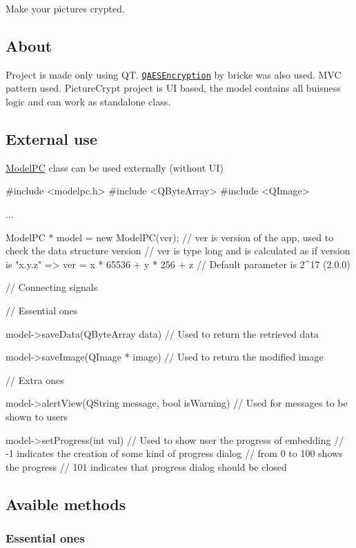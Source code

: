 Make your pictures crypted.

\subsection*{About}

Project is made only using QT. \href{http://github.com/bricke/Qt-AES}{\tt Q\+A\+E\+S\+Encryption} by bricke was also used. M\+VC pattern used. Picture\+Crypt project is UI based, the model contains all buisness logic and can work as standalone class.

\subsection*{External use}

\mbox{\hyperlink{class_model_p_c}{Model\+PC}} class can be used externally (without UI) 
\begin{DoxyCode}
#include <modelpc.h>
#include <QByteArray>
#include <QImage>

...

ModelPC * model = new ModelPC(ver);
// ver is version of the app, used to check the data structure version
// ver is type long and is calculated as if version is "x.y.z" => ver = x * 65536 + y * 256 + z
// Default parameter is 2^17 (2.0.0)

// Connecting signals

// Essential ones

model->saveData(QByteArray data)
// Used to return the retrieved data

model->saveImage(QImage * image)
// Used to return the modified image

// Extra ones

model->alertView(QString message, bool isWarning)
// Used for messages to be shown to users

model->setProgress(int val)
// Used to show user the progress of embedding
// -1 indicates the creation of some kind of progress dialog
// from 0 to 100 shows the progress
// 101 indicates that progress dialog should be closed
\end{DoxyCode}


\subsection*{Avaible methods}

\subsubsection*{Essential ones}

